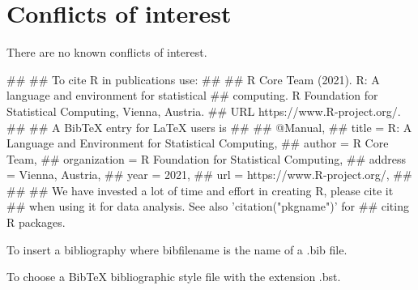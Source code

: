\documentclass[9pt, onecolumn,twoside]{gsajnl}
\begin{document}
\section{Conflicts of interest}
There are  no known conflicts of interest.

## 
## To cite R in publications use:
## 
##   R Core Team (2021). R: A language and environment for statistical
##   computing. R Foundation for Statistical Computing, Vienna, Austria.
##   URL https://www.R-project.org/.
## 
## A BibTeX entry for LaTeX users is
## 
##   @Manual{,
##     title = {R: A Language and Environment for Statistical Computing},
##     author = {{R Core Team}},
##     organization = {R Foundation for Statistical Computing},
##     address = {Vienna, Austria},
##     year = {2021},
##     url = {https://www.R-project.org/},
##   }
## 
## We have invested a lot of time and effort in creating R, please cite it
## when using it for data analysis. See also 'citation("pkgname")' for
## citing R packages.



    To insert a bibliography where bibfilename is the name of a .bib file.



        To choose a BibTeX bibliographic style file with the extension .bst.
\end{document}
